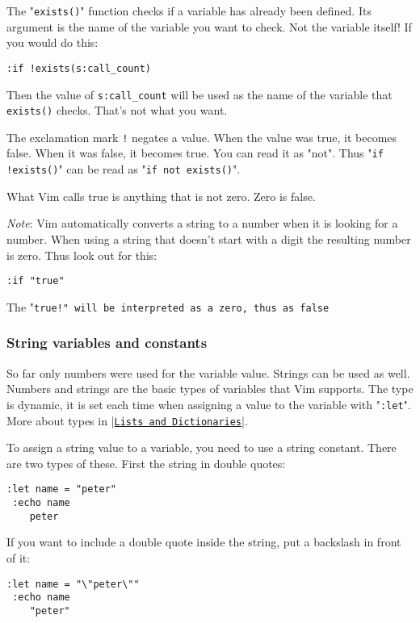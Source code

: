The "\texttt{exists()}" function checks if a variable has already been defined.
Its argument is the name of the variable you want to check.
Not the variable itself!  If you would do this:

\begin{Verbatim}[samepage=true]
 :if !exists(s:call_count)
\end{Verbatim}

Then the value of \texttt{s:call\_count} will be used as the name of the variable that \texttt{exists()} checks.
That's not what you want.

The exclamation mark \texttt{!} negates a value.
When the value was true, it becomes false.
When it was false, it becomes true.
You can read it as "not".
Thus "\texttt{if !exists()}" can be read as "\texttt{if not exists()}".

What Vim calls true is anything that is not zero.
Zero is false.

\emph{Note}:
Vim automatically converts a string to a number when it is looking for a number.
When using a string that doesn't start with a digit the resulting number is zero.
Thus look out for this:

\begin{Verbatim}[samepage=true]
  :if "true"
\end{Verbatim}

The "\texttt{true!" will be interpreted as a zero, thus as false}
\subsubsection{String variables and constants}
So far only numbers were used for the variable value.
Strings can be used as well.
Numbers and strings are the basic types of variables that Vim supports.
The type is dynamic, it is set each time when assigning a value to the variable with "\texttt{:let}".
More about types in |\hyperref[Lists and Dictionaries]{\texttt{Lists and Dictionaries}}|.

To assign a string value to a variable, you need to use a string constant.
There are two types of these.
First the string in double quotes:

\begin{Verbatim}[samepage=true]
 :let name = "peter"
 :echo name
    peter
\end{Verbatim}

If you want to include a double quote inside the string, put a backslash in front of it:

\begin{Verbatim}[samepage=true]
 :let name = "\"peter\""
 :echo name
    "peter"
\end{Verbatim}

